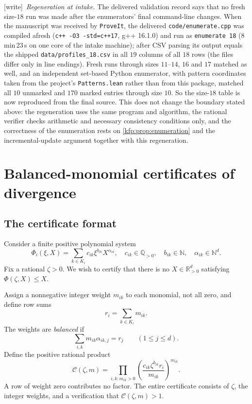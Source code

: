 \documentclass[11pt,a4paper]{article}
\theoremstyle{definition}
\theoremstyle{remark}
\newcommand{\R}{\mathbb R}
\newcommand{\Q}{\mathbb Q}
\newcommand{\N}{\mathbb N}
\newcommand{\repo}{\texttt{ProveIt}}
\newcommand{\wtag}{\textsf{\small[write]}}
\begin{document}
\wtag\ \emph{Regeneration at intake.} The delivered validation record says
that no fresh size-$18$ run was made after the enumerators' final
command-line changes. When the manuscript was received by \repo, the
delivered \texttt{code/enumerate.cpp} was compiled afresh
(\texttt{c++ -O3 -std=c++17}, g++ 16.1.0) and run as \texttt{enumerate 18}
(8\,min\,23\,s on one core of the intake machine); after CSV parsing its
output equals the shipped \texttt{data/profiles\_18.csv} in all $19$ columns
of all $18$ rows (the files differ only in line endings). Fresh runs through
sizes $11$--$14$, $16$ and $17$ matched as well, and an independent set-based
Python enumerator, with pattern coordinates taken from the project's
\texttt{Patterns.lean} rather than from this package, matched all $10$
unmarked and $170$ marked entries through size $10$. So the size-$18$ table is
now reproduced from the final source. This does not change the boundary
stated above: the regeneration uses the same program and algorithm, the
rational verifier checks arithmetic and necessary consistency conditions
only, and the correctness of the enumeration rests on
\cref{kfp:prop:enumeration} and the incremental-update argument together
with this regeneration.

\section{Balanced-monomial certificates of divergence}
\label{kfp:sec:dual}

\subsection{The certificate format}
Consider a finite positive polynomial system
\begin{equation}\label{kfp:eq:general-map}
 \Phi_i(\xi,X)=\sum_{k\in K_i}c_{ik}\xi^{b_{ik}}X^{\alpha_{ik}},
 \quad c_{ik}\in\Q_{>0},\quad b_{ik}\in\N,
 \quad \alpha_{ik}\in\N^d.
\end{equation}
Fix a rational $\zeta>0$. We wish to certify that there is no
$X\in\R_{>0}^d$ satisfying $\Phi(\zeta,X)\leq X$.

Assign a nonnegative integer weight $m_{ik}$ to each monomial, not all zero,
and define row sums
\[
 r_i=\sum_{k\in K_i}m_{ik}.
\]
The weights are \emph{balanced} if
\begin{equation}\label{kfp:eq:balance}
 \sum_{i,k}m_{ik}\alpha_{ik,j}=r_j\qquad(1\leq j\leq d).
\end{equation}
Define the positive rational product
\begin{equation}\label{kfp:eq:dual-product}
 \mathcal C(\zeta,m)=
 \prod_{i,k:m_{ik}>0}
 \left(\frac{c_{ik}\zeta^{b_{ik}}r_i}{m_{ik}}\right)^{m_{ik}}.
\end{equation}
A row of weight zero contributes no factor. The entire certificate consists
of $\zeta$, the integer weights, and a verification that
$\mathcal C(\zeta,m)>1$.
\end{document}
